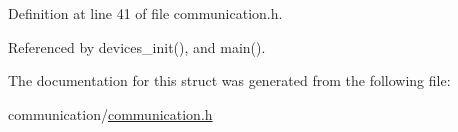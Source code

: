 Definition at line 41 of file communication.\-h.



Referenced by devices\-\_\-init(), and main().



The documentation for this struct was generated from the following file\-:\begin{DoxyCompactItemize}
\item 
communication/\hyperlink{communication_2communication_8h}{communication.\-h}\end{DoxyCompactItemize}
